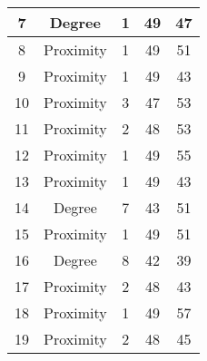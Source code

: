 \documentclass[results.tex]{subfiles}
\begin{document}
\begin{center}
\begin{tabular}{| c || c | c | c | c |}
            \hline
            7                       & Degree                       & 1                      & 49                      & 47                   \\
            \hline
            8                       & Proximity                    & 1                      & 49                      & 51                   \\
            \hline
            9                       & Proximity                    & 1                      & 49                      & 43                   \\
            \hline
            10                      & Proximity                    & 3                      & 47                      & 53                   \\
            \hline
            11                      & Proximity                    & 2                      & 48                      & 53                   \\
            \hline
            12                      & Proximity                    & 1                      & 49                      & 55                   \\
            \hline
            13                      & Proximity                    & 1                      & 49                      & 43                   \\
            \hline
            14                      & Degree                       & 7                      & 43                      & 51                   \\
            \hline
            15                      & Proximity                    & 1                      & 49                      & 51                   \\
            \hline
            16                      & Degree                       & 8                      & 42                      & 39                   \\
            \hline
            17                      & Proximity                    & 2                      & 48                      & 43                   \\
            \hline
            18                      & Proximity                    & 1                      & 49                      & 57                   \\
            \hline
            19                      & Proximity                    & 2                      & 48                      & 45                   \\

\end{tabular}
\end{center}
\end{document}
